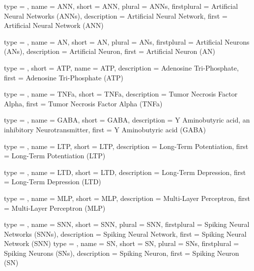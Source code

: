 %
%
%


{
	type        = \acronymtype,
	name        = {ANN},
	short       = {ANN},
	plural      = ANNs,
	firstplural = Artificial Neural Networks (ANNs),
	description = {Artificial Neural Network},
	first       = {Artificial Neural Network (ANN)}
}

{
	type        = \acronymtype,
	name        = {AN},
	short       = {AN},
	plural      = ANs,
	firstplural = Artificial Neurons (ANs),
	description = {Artificial Neuron},
	first       = {Artificial Neuron (AN)}
}

{
	type        = \acronymtype,
	short       = {ATP},
  	name        = {ATP},
	description = {Adenosine Tri-Phosphate},
	first       = {Adenosine Tri-Phosphate (ATP)}
}

{
	type        = \acronymtype,
   	name        = {TNFa},
	short       = {TNFa},
	description = {Tumor Necrosis Factor Alpha},
	first       = {Tumor Necrosis Factor Alpha (TNFa)}
}

{
    type        = \acronymtype,
	name        = {GABA},
  	short       = {GABA},
	description = {Y Aminobutyric acid, an inhibitory Neurotransmitter},
	first       = {Y Aminobutyric acid (GABA)}
}

{
	type        = \acronymtype,
	name        = {LTP},
	short       = {LTP},
	description = {Long-Term Potentiation},
	first       = {Long-Term Potentiation (LTP)}
}

{
	type        = \acronymtype,
	name        = {LTD},
	short       = {LTD},
	description = {Long-Term Depression},
	first       = {Long-Term Depression (LTD)}
}

{
	type        = \acronymtype,
	name        = {MLP},
	short       = {MLP},
	description = {Multi-Layer Perceptron},
	first       = {Multi-Layer Perceptron (MLP)}
}

{
	type        = \acronymtype,
	name        = {SNN},
	short       = {SNN},
	plural      = SNN,
	firstplural = Spiking Neural Networks (SNNs),
	description = {Spiking Neural Network},
	first       = {Spiking Neural Network (SNN)}
}
{
	type        = \acronymtype,
	name        = {SN},
	short       = {SN},
	plural      = SNs,
	firstplural = Spiking Neurons (SNs),
	description = {Spiking Neuron},
	first       = {Spiking Neuron (SN)}
}


